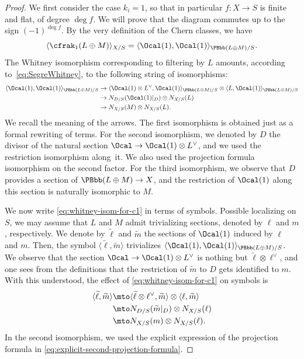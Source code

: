 \begin{proof}
We first consider the case $k_i= 1$, so that in particular $f\colon X\to S$ is finite and flat, of degree $\deg f$. We will prove that the diagram commutes up to the sign $(-1)^{\deg f}$. By the very definition of the Chern classes, we have
\begin{displaymath}
\langle\cfrak_{1}(L\oplus M)\rangle_{X/S}=\langle\Ocal(1),\Ocal(1)\rangle_{\PBbb(L\oplus M)/S}.
\end{displaymath}
The Whitney isomorphism corresponding to filtering by $L$ amounts, according to~\eqref{eq:SegreWhitney}, to the following string of isomorphisms:
\begin{equation}\label{eq:whitney-isom-for-c1}
\begin{split}
\langle\Ocal(1),\Ocal(1)\rangle_{\PBbb(L\oplus M)/S}&\to \langle\Ocal(1)\otimes L^{\vee},\Ocal(1)\rangle_{\PBbb(L\oplus M)/S}\otimes \langle L,\Ocal(1)\rangle_{\PBbb(L\oplus M)/S}\\
&\to N_{D/S}(\Ocal(1)|_{D})\otimes N_{X/S}(L)\\
&\to N_{X/S}(M)\otimes N_{X/S}(L).
\end{split}
\end{equation}
We recall the meaning of the arrows. The first isomorphism is obtained just as a formal rewriting of terms. For the second isomorphism, we denoted by $D$ the divisor of the natural section $\Ocal\to\Ocal(1)\otimes L^{\vee}$, and we used the restriction isomorphism along~it. We also used the projection formula isomorphism on the second factor. For the third isomorphism, we observe that $D$ provides a section of $\PBbb(L\oplus M)\to X$, and the restriction of $\Ocal(1)$ along this section is naturally isomorphic to $M$.

We now write \eqref{eq:whitney-isom-for-c1} in terms of symbols. Possible localizing on $S$, we may assume that $L$ and $M$ admit trivializing sections, denoted by $\ell$ and $m$, respectively. We denote by $\widetilde{\ell}$ and $\widetilde{m}$ the sections of $\Ocal(1)$ induced by $\ell$ and $m$. Then, the symbol $\langle\widetilde{\ell},\widetilde{m}\rangle$ trivializes $\langle\Ocal(1),\Ocal(1)\rangle_{\PBbb(L\oplus M)/S}$. We observe that the section $\Ocal\to\Ocal(1)\otimes L^{\vee}$ is nothing but $\widetilde{\ell}\otimes\ell^{\vee}$, and one sees from the definitions that the restriction of $\widetilde{m}$ to $D$ gets identified to $m$. With this understood, the effect of \eqref{eq:whitney-isom-for-c1} on symbols is
\begin{equation}\label{eq:whitney-isom-for-c1-sections}
\begin{split}
\langle\widetilde{\ell},\widetilde{m}\rangle &\mto \langle\widetilde{\ell}\otimes\ell^{\vee},\widetilde{m}\rangle\otimes \langle \ell,\widetilde{m}\rangle\\
&\mto N_{D/S}(\widetilde{m}|_{D})\otimes N_{X/S}(\ell)\\
&\mto N_{X/S}(m)\otimes N_{X/S}(\ell).
\end{split}
\end{equation}
In the second isomorphism, we used the explicit expression of the projection formula in \eqref{eq:explicit-second-projection-formula}.


\end{proof}
